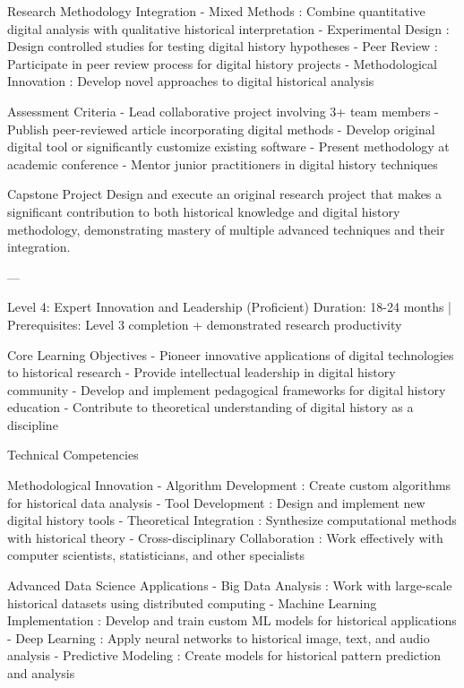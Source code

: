 \begin{appendices}
    Research Methodology Integration
-  Mixed Methods : Combine quantitative digital analysis with qualitative historical interpretation
-  Experimental Design : Design controlled studies for testing digital history hypotheses
-  Peer Review : Participate in peer review process for digital history projects
-  Methodological Innovation : Develop novel approaches to digital historical analysis

    Assessment Criteria
- Lead collaborative project involving 3+ team members
- Publish peer-reviewed article incorporating digital methods
- Develop original digital tool or significantly customize existing software
- Present methodology at academic conference
- Mentor junior practitioners in digital history techniques

    Capstone Project
Design and execute an original research project that makes a significant contribution to both historical knowledge and digital history methodology, demonstrating mastery of multiple advanced techniques and their integration.

---

   Level 4: Expert Innovation and Leadership (Proficient)
 Duration: 18-24 months | Prerequisites: Level 3 completion + demonstrated research productivity 

    Core Learning Objectives
- Pioneer innovative applications of digital technologies to historical research
- Provide intellectual leadership in digital history community
- Develop and implement pedagogical frameworks for digital history education
- Contribute to theoretical understanding of digital history as a discipline

    Technical Competencies

     Methodological Innovation
-  Algorithm Development : Create custom algorithms for historical data analysis
-  Tool Development : Design and implement new digital history tools
-  Theoretical Integration : Synthesize computational methods with historical theory
-  Cross-disciplinary Collaboration : Work effectively with computer scientists, statisticians, and other specialists

     Advanced Data Science Applications
-  Big Data Analysis : Work with large-scale historical datasets using distributed computing
-  Machine Learning Implementation : Develop and train custom ML models for historical applications
-  Deep Learning : Apply neural networks to historical image, text, and audio analysis
-  Predictive Modeling : Create models for historical pattern prediction and analysis


\end{appendices}
